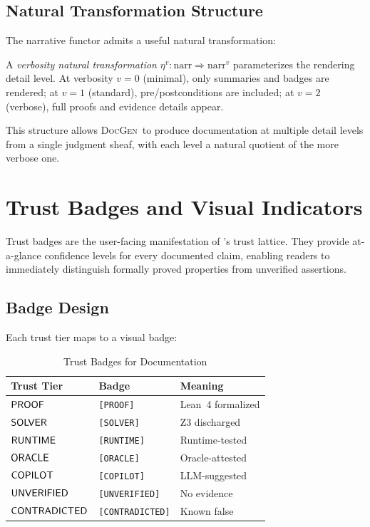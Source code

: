 \documentclass[11pt]{article}
\newcommand{\DocGen}{\textsc{DocGen}}
\newcommand{\NarrFunc}{\mathrm{narr}}
\begin{document}
\subsection{Natural Transformation Structure}
The narrative functor admits a useful natural transformation:

\begin{definition}\label{def:verbosity}
A \emph{verbosity natural transformation} $\eta^v \colon \NarrFunc
\Rightarrow \NarrFunc^v$ parameterizes the rendering detail level.
At verbosity $v = 0$ (minimal), only summaries and badges are rendered;
at $v = 1$ (standard), pre/postconditions are included; at $v = 2$
(verbose), full proofs and evidence details appear.
\end{definition}

This structure allows \DocGen\ to produce documentation at multiple
detail levels from a single judgment sheaf, with each level a natural
quotient of the more verbose one.

\section{Trust Badges and Visual Indicators}\label{sec:trust-badges}

Trust badges are the user-facing manifestation of \JuGeo's trust
lattice.  They provide at-a-glance confidence levels for every
documented claim, enabling readers to immediately distinguish
formally proved properties from unverified assertions.

\subsection{Badge Design}
Each trust tier maps to a visual badge:

\begin{table}[H]
\centering
\caption{Trust Badges for Documentation}
\label{tab:trust-badges}
\begin{tabular}{lll}
\toprule
\textbf{Trust Tier} & \textbf{Badge} & \textbf{Meaning} \\
\midrule
$\mathsf{PROOF}$ & \texttt{[PROOF]} & Lean~4 formalized \\
$\mathsf{SOLVER}$ & \texttt{[SOLVER]} & Z3 discharged \\
$\mathsf{RUNTIME}$ & \texttt{[RUNTIME]} & Runtime-tested \\
$\mathsf{ORACLE}$ & \texttt{[ORACLE]} & Oracle-attested \\
$\mathsf{COPILOT}$ & \texttt{[COPILOT]} & LLM-suggested \\
$\mathsf{UNVERIFIED}$ & \texttt{[UNVERIFIED]} & No evidence \\
$\mathsf{CONTRADICTED}$ & \texttt{[CONTRADICTED]} & Known false \\
\bottomrule
\end{tabular}
\end{table}
\end{document}
